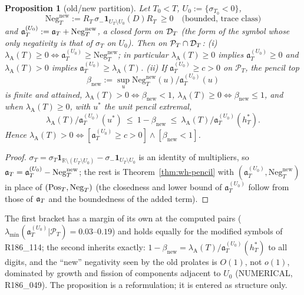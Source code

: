\documentclass[11pt]{amsart}
\newtheorem{proposition}[theorem]{Proposition}
\theoremstyle{definition}
\theoremstyle{remark}
\newcommand{\R}{\mathbb R}
\newcommand{\PT}{\mathcal P_T}
\newcommand{\sT}{\sigma_T}
\begin{document}
\begin{proposition}[old/new partition]\label{prop:wh-oldnew}
Let $T_0<T$, $U_0:=\{\sigma_{T_0}<0\}$,
\[
\mathrm{Neg}^{\mathrm{new}}_T:=R_T\,\sigma_-\mathbf 1_{U_T\setminus U_0}(D)R_T\ \ge0\quad\text{(bounded, trace class)}
\]
and $\mathfrak a^{(U_0)}_T:=\mathfrak a_T+\mathrm{Neg}^{\mathrm{new}}_T$, a closed form on $\mathcal D_T$ (the form of the symbol whose only
negativity is that of $\sT$ on $U_0$). Then on $\PT\cap\DT$:
\emph{(i)} $\lambda_{\mathrm A}(T)\ge0\iff\mathfrak a^{(U_0)}_T\ge\mathrm{Neg}^{\mathrm{new}}_T$; in particular $\lambda_{\mathrm A}(T)\ge0$ implies
$\mathfrak a^{(U_0)}_T\ge0$ and $\lambda_{\mathrm A}(T)>0$ implies $\mathfrak a^{(U_0)}_T\ge\lambda_{\mathrm A}(T)$.
\emph{(ii)} If $\mathfrak a^{(U_0)}_T\ge c>0$ on $\PT$, the pencil top
\[
\beta_{\mathrm{new}}:=\sup_u\mathrm{Neg}^{\mathrm{new}}_T(u)/\mathfrak a^{(U_0)}_T(u)
\]
is finite
and attained, $\lambda_{\mathrm A}(T)>0\iff\beta_{\mathrm{new}}<1$, $\lambda_{\mathrm A}(T)\ge0\iff\beta_{\mathrm{new}}\le1$, and when
$\lambda_{\mathrm A}(T)\ge0$, with $u^*$ the unit pencil extremal,
\[
\lambda_{\mathrm A}(T)/\mathfrak a^{(U_0)}_T(u^*)\ \le\ 1-\beta_{\mathrm{new}}\ \le\ \lambda_{\mathrm A}(T)/\mathfrak a^{(U_0)}_T(h^*_T).
\]
Hence $\lambda_{\mathrm A}(T)>0\iff[\mathfrak a^{(U_0)}_T\ge c>0]\wedge[\beta_{\mathrm{new}}<1]$.
\end{proposition}
\begin{proof}
$\sT=\sT\mathbf 1_{\R\setminus(U_T\setminus U_0)}-\sigma_-\mathbf 1_{U_T\setminus U_0}$ is an identity of multipliers, so
$\mathfrak a_T=\mathfrak a^{(U_0)}_T-\mathrm{Neg}^{\mathrm{new}}_T$; the rest is Theorem~\ref{thm:wh-pencil} with $(\mathfrak a^{(U_0)}_T,\mathrm{Neg}^{\mathrm{new}}_T)$ in
place of $(\mathrm{Pos}_T,\mathrm{Neg}_T)$ (the closedness and lower bound of $\mathfrak a^{(U_0)}_T$ follow from those of $\mathfrak a_T$ and the boundedness of the added term).
\end{proof}
The first bracket has a margin of its own at the computed pairs ($\lambda_{\min}(\mathfrak a^{(U_0)}_T|\PT)=0.03$--$0.19$) and holds
equally for the modified symbols of R186\_114; the second inherits exactly: $1-\beta_{\mathrm{new}}=\lambda_{\mathrm A}(T)/\mathfrak a^{(U_0)}_T(h^*_T)$ to all
digits, and the ``new'' negativity seen by the old prolates is $O(1)$, not $o(1)$, dominated by growth and fission of components
adjacent to $U_0$ (NUMERICAL, R186\_049). The proposition is a reformulation; it is entered as structure only.
\end{document}
